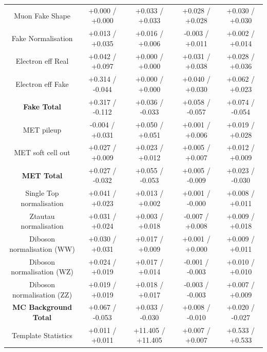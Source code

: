 \begin{table}[htbp]
\begin{center}
\begin{tabular}{|c|c|c|c|c|}
   \hline
   Muon Fake Shape                       &  +0.000   / +0.000   & +0.033   / +0.033   & +0.028   / +0.028   & +0.030   / +0.030   \\
   Fake Normalisation                    &  +0.013   / +0.035   & +0.016   / +0.006   & -0.003   / +0.011   & +0.002   / +0.014   \\
   Electron eff Real                     &  +0.042   / +0.097   & +0.000   / +0.000   & +0.031   / +0.038   & +0.028   / +0.036   \\
   Electron eff Fake                     &  +0.314   / -0.044   & +0.000   / +0.000   & +0.040   / +0.030   & +0.062   / +0.023   \\
   \hline
   \textbf{Fake Total}                   &  +0.317   / -0.112   & +0.036   / -0.033   & +0.058   / -0.057   & +0.074   / -0.054   \\
   \hline
   MET pileup                            &  -0.004   / +0.031   & +0.050   / +0.051   & +0.001   / +0.006   & +0.019   / +0.028   \\
   MET soft cell out                     &  +0.027   / +0.009   & +0.023   / +0.012   & +0.005   / +0.007   & +0.012   / +0.009   \\
   \hline
   \textbf{MET Total}                    &  +0.027   / -0.032   & +0.055   / -0.053   & +0.005   / -0.009   & +0.023   / -0.030   \\
   \hline
   Single Top normalisation              &  +0.041   / +0.023   & +0.013   / +0.002   & +0.001   / -0.000   & +0.008   / +0.011   \\
   Ztautau normalisation                 &  +0.031   / +0.024   & +0.003   / +0.018   & -0.007   / +0.008   & +0.009   / +0.018   \\
   Diboson normalisation (WW)            &  +0.030   / +0.031   & +0.017   / +0.009   & +0.001   / +0.000   & +0.009   / +0.011   \\
   Diboson normalisation (WZ)            &  +0.024   / +0.019   & +0.017   / +0.014   & -0.001   / -0.003   & +0.010   / +0.010   \\
   Diboson normalisation (ZZ)            &  +0.019   / +0.019   & +0.018   / +0.017   & -0.003   / -0.003   & +0.007   / +0.009   \\
   \hline
   \textbf{MC Background Total}          &  +0.067   / -0.053   & +0.033   / -0.030   & +0.008   / -0.010   & +0.020   / -0.027   \\
   \hline
   Template Statistics                   &  +0.011   / +0.011   & +11.405  / +11.405  & +0.007   / +0.007   & +0.533   / +0.533   \\

\end{tabular}
\end{center}
\end{table}
